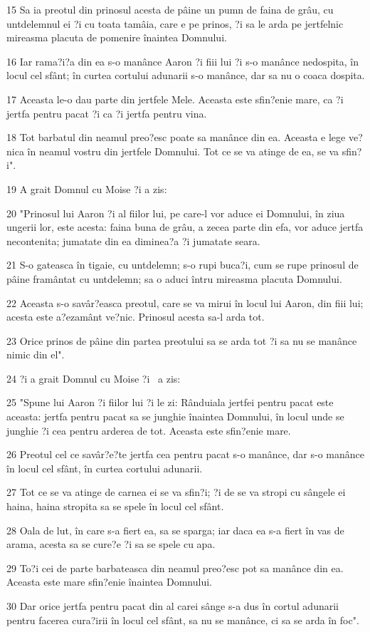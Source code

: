 \par 15 Sa ia preotul din prinosul acesta de pâine un pumn de faina de grâu, cu untdelemnul ei ?i cu toata tamâia, care e pe prinos, ?i sa le arda pe jertfelnic mireasma placuta de pomenire înaintea Domnului.
\par 16 Iar rama?i?a din ea s-o manânce Aaron ?i fiii lui ?i s-o manânce nedospita, în locul cel sfânt; în curtea cortului adunarii s-o manânce, dar sa nu o coaca dospita.
\par 17 Aceasta le-o dau parte din jertfele Mele. Aceasta este sfin?enie mare, ca ?i jertfa pentru pacat ?i ca ?i jertfa pentru vina.
\par 18 Tot barbatul din neamul preo?esc poate sa manânce din ea. Aceasta e lege ve?nica în neamul vostru din jertfele Domnului. Tot ce se va atinge de ea, se va sfin?i".
\par 19 A grait Domnul cu Moise ?i a zis:
\par 20 "Prinosul lui Aaron ?i al fiilor lui, pe care-l vor aduce ei Domnului, în ziua ungerii lor, este acesta: faina buna de grâu, a zecea parte din efa, vor aduce jertfa necontenita; jumatate din ea diminea?a ?i jumatate seara.
\par 21 S-o gateasca în tigaie, cu untdelemn; s-o rupi buca?i, cum se rupe prinosul de pâine framântat cu untdelemn; sa o aduci întru mireasma placuta Domnului.
\par 22 Aceasta s-o savâr?easca preotul, care se va mirui în locul lui Aaron, din fiii lui; acesta este a?ezamânt ve?nic. Prinosul acesta sa-l arda tot.
\par 23 Orice prinos de pâine din partea preotului sa se arda tot ?i sa nu se manânce nimic din el".
\par 24 ?i a grait Domnul cu Moise ?i  a zis:
\par 25 "Spune lui Aaron ?i fiilor lui ?i le zi: Rânduiala jertfei pentru pacat este aceasta: jertfa pentru pacat sa se junghie înaintea Domnului, în locul unde se junghie ?i cea pentru arderea de tot. Aceasta este sfin?enie mare.
\par 26 Preotul cel ce savâr?e?te jertfa cea pentru pacat s-o manânce, dar s-o manânce în locul cel sfânt, în curtea cortului adunarii.
\par 27 Tot ce se va atinge de carnea ei se va sfin?i; ?i de se va stropi cu sângele ei haina, haina stropita sa se spele în locul cel sfânt.
\par 28 Oala de lut, în care s-a fiert ea, sa se sparga; iar daca ea s-a fiert în vas de arama, acesta sa se cure?e ?i sa se spele cu apa.
\par 29 To?i cei de parte barbateasca din neamul preo?esc pot sa manânce din ea. Aceasta este mare sfin?enie înaintea Domnului.
\par 30 Dar orice jertfa pentru pacat din al carei sânge s-a dus în cortul adunarii pentru facerea cura?irii în locul cel sfânt, sa nu se manânce, ci sa se arda în foc".

